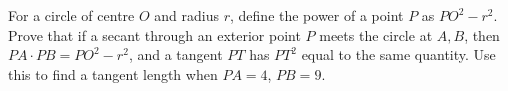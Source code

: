 For a circle of centre $O$ and radius $r$, define the power of a point $P$ as $PO^2-r^2$. Prove that if a secant through an exterior point $P$ meets the circle at $A,B$, then $PA\cdot PB=PO^2-r^2$, and a tangent $PT$ has $PT^2$ equal to the same quantity. Use this to find a tangent length when $PA=4$, $PB=9$.
